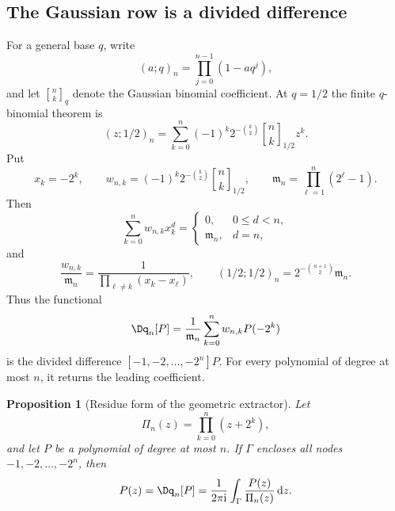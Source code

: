 \documentclass[11pt,oneside]{article}
\newtheorem{proposition}[theorem]{Proposition}
\theoremstyle{definition}
\theoremstyle{remark}
\newcommand{\ii}{\mathrm i}
\newcommand{\dd}{\,\mathrm d}
\newcommand{\qbinom}[3]{\genfrac{[}{]}{0pt}{}{#1}{#2}_{#3}}
\begin{document}
\subsection{The Gaussian row is a divided difference}

For a general base $q$, write
\begin{equation}
 (a;q)_n=\prod_{j=0}^{n-1}(1-aq^j),                       \label{dyadicweb:eq:qpoch-def-local}
\end{equation}
and let $\qbinom nkq$ denote the Gaussian binomial coefficient.  At $q=1/2$ the finite
$q$-binomial theorem is
\begin{equation}
 (z;1/2)_n=\sum_{k=0}^{n}(-1)^k2^{-\binom k2}
 \qbinom nk{1/2}z^k.                                      \label{dyadicweb:eq:finite-q-binomial-local}
\end{equation}
Put
\begin{equation}
 x_k=-2^k,
 \qquad
 w_{n,k}=(-1)^k2^{-\binom k2}\qbinom nk{1/2},
 \qquad
 \mathfrak m_n=\prod_{\ell=1}^{n}(2^\ell-1).              \label{dyadicweb:eq:q-nodes-weights}
\end{equation}
Then
\begin{equation}
 \sum_{k=0}^{n}w_{n,k}x_k^d=
 \begin{cases}
 0,&0\le d<n,\\
 \mathfrak m_n,&d=n,
 \end{cases}                                               \label{dyadicweb:eq:q-node-moments}
\end{equation}
and
\begin{equation}
 \frac{w_{n,k}}{\mathfrak m_n}
 =\frac1{\prod_{\ell\ne k}(x_k-x_\ell)},
 \qquad
 (1/2;1/2)_n=2^{-\binom{n+1}{2}}\mathfrak m_n.             \label{dyadicweb:eq:q-barycentric-normalization}
\end{equation}
Thus the functional
\begin{equation}
 \Dq_n[P]=\frac1{\mathfrak m_n}\sum_{k=0}^{n}w_{n,k}P(-2^k) \label{dyadicweb:eq:Dq-def}
\end{equation}
is the divided difference $[-1,-2,\ldots,-2^n]P$.  For every polynomial of degree at most
$n$, it returns the leading coefficient.

\begin{proposition}[Residue form of the geometric extractor]
\label{dyadicweb:prop:q-residue-extractor}
Let
\[
 \Pi_n(z)=\prod_{k=0}^{n}(z+2^k),
\]
and let $P$ be a polynomial of degree at most $n$.  If $\Gamma$ encloses all nodes
$-1,-2,\ldots,-2^n$, then
\begin{equation}
 [z^n]P(z)=\Dq_n[P]
 =\frac{1}{2\pi\ii}\int_\Gamma\frac{P(z)}{\Pi_n(z)}\dd z. \label{dyadicweb:eq:q-residue-extractor}
\end{equation}
\end{proposition}
\end{document}
